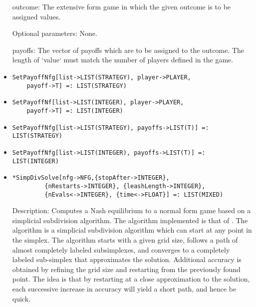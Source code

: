 \begin{itemize}
\bd
\item
[outcome:] The extensive form game in which the given outcome is to be
assigned values.
\ed

\item
[Optional parameters:] None.
\bd
\item
[payoffs:] The vector of payoffs which are to be assigned to the
outcome.  The length of `value` must match the number of players
defined in the game.
\ed
\ed

\item
\protect \large \begin{verbatim}
SetPayoffNfg[list->LIST(STRATEGY), player->PLAYER, 
	payoff->T] =: LIST(STRATEGY)
\end{verbatim}\normalsize

\item
\protect \large \begin{verbatim}
SetPayoffNf[list->LIST(INTEGER), player->PLAYER, 
	payoff->T] =: LIST(INTEGER)
\end{verbatim}\normalsize

\item
\protect \large \begin{verbatim}
SetPayoffNfg[list->LIST(STRATEGY), payoffs->LIST(T)] =: LIST(STRATEGY)
\end{verbatim}\normalsize

\item
\protect \large \begin{verbatim}
SetPayoffNfg[list->LIST(INTEGER), payoffs->LIST(T)] =: LIST(INTEGER)
\end{verbatim}\normalsize



\item
\protect \large \begin{verbatim}
*SimpDivSolve[nfg->NFG,{stopAfter->INTEGER}, 
         {nRestarts->INTEGER}, {leashLength->INTEGER},
         {nEvals<->INTEGER}, {time<->FLOAT}] =: LIST(MIXED)
\end{verbatim}\normalsize

\bd
\item
[Description:] Computes a Nash equilibrium to a normal form game based
on a simplicial subdivision algorithm.  The algorithm implemented is
that of \cite{VTH:1987}.  The 
algorithm is a simplicial subdivision algorithm which can start at any
point in the simplex.  The algorithm starts with a given grid size,
follows a path of almost completely labeled subsimplexes, and
converges to a completely labeled sub-simplex that approximates the
solution.  Additional accuracy is obtained by refining the grid size
and restarting from the previously found point.  The idea is that by
restarting at a close approximation to the solution, each successive
increase in accuracy will yield a short path, and hence be quick.


\end{itemize}
